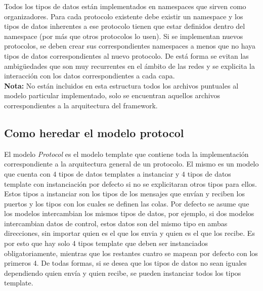 \documentclass[10pt,a4paper]{article}
\begin{document}
Todos los tipos de datos están implementados en namespaces que sirven como organizadores. Para cada protocolo existente debe existir un namespace y los tipos de datos inherentes a ese protocolo tienen que estar definidos dentro del namespace (por más que otros protocolos lo usen). Si se implementan nuevos protocolos, se deben crear sus correspondientes namespaces a menos que no haya tipos de datos correspondientes al nuevo protocolo. De está forma se evitan las ambigüedades que son muy recurrentes en el ámbito de las redes y se explicita la interacción con los datos correspondientes a cada capa. \\

\textbf{Nota: } No están incluidos en esta estructura todos los archivos puntuales al modelo particular implementado, solo se encuentran aquellos archivos correspondientes a la arquitectura del framework. \\

\subsection{Como heredar el modelo protocol}

El modelo \textit{Protocol} es el modelo template que contiene toda la implementación correspondiente a la arquitectura general de un protocolo. El mismo es un modelo que cuenta con $4$ tipos de datos templates a instanciar y $4$ tipos de datos template con instanciación por defecto si no se explicitaran otros tipos para ellos. Estos tipos a instanciar son los tipos de los mensajes que envían y reciben los puertos y los tipos con los cuales se definen las colas. Por defecto se asume que los modelos intercambian los mismos tipos de datos, por ejemplo, si dos modelos intercambian datos de control, estos datos son del mismo tipo en ambas direcciones, sin importar quien es el que los envia y quien es el que los recibe. Es por esto que hay solo 4 tipos template que deben ser instanciados obligatoriamente, mientras que los restantes cuatro se mapean por defecto con los primeros 4. De todas formas, si se desea que los tipos de datos no sean iguales dependiendo quien envía y quien recibe, se pueden instanciar todos los tipos template.\\
\end{document}
